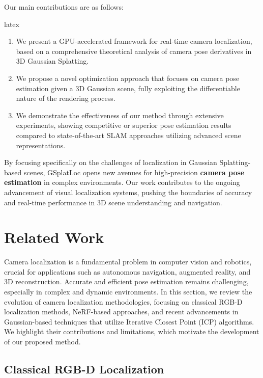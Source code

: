 \documentclass[twocolumn]{article} %
\begin{document}
Our main contributions are as follows:

latex

\begin{enumerate}
\def\labelenumi{\arabic{enumi}.}
\item
  We present a GPU-accelerated framework for real-time camera
  localization, based on a comprehensive theoretical analysis of camera
  pose derivatives in 3D Gaussian Splatting.
\item
  We propose a novel optimization approach that focuses on camera pose
  estimation given a 3D Gaussian scene, fully exploiting the
  differentiable nature of the rendering process.
\item
  We demonstrate the effectiveness of our method through extensive
  experiments, showing competitive or superior pose estimation results
  compared to state-of-the-art SLAM approaches utilizing advanced scene
  representations.
\end{enumerate}

By focusing specifically on the challenges of localization in Gaussian
Splatting-based scenes, GSplatLoc opens new avenues for high-precision
\textbf{camera pose estimation} in complex environments. Our work
contributes to the ongoing advancement of visual localization systems,
pushing the boundaries of accuracy and real-time performance in 3D scene
understanding and navigation.

\section{Related Work}\label{related-work}

Camera localization is a fundamental problem in computer vision and
robotics, crucial for applications such as autonomous navigation,
augmented reality, and 3D reconstruction. Accurate and efficient pose
estimation remains challenging, especially in complex and dynamic
environments. In this section, we review the evolution of camera
localization methodologies, focusing on classical RGB-D localization
methods, NeRF-based approaches, and recent advancements in
Gaussian-based techniques that utilize Iterative Closest Point (ICP)
algorithms. We highlight their contributions and limitations, which
motivate the development of our proposed method.

\subsection{Classical RGB-D
Localization}\label{classical-rgb-d-localization}
\end{document}
